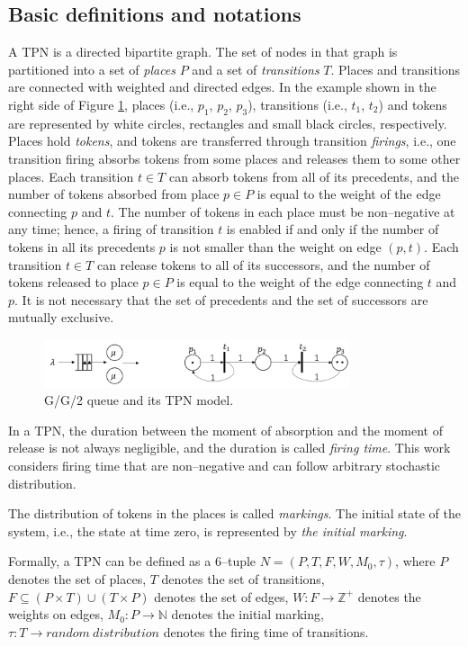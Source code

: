 \documentclass[suppldata]{interact}
\theoremstyle{plain}
\theoremstyle{definition}
\theoremstyle{remark}
\begin{document}
\subsection{Basic definitions and notations}
A TPN is a directed bipartite graph. The set of nodes in that graph is partitioned into a set of \textit{places} $P$ and a set of \textit{transitions} $T$. Places and transitions are connected with weighted and directed edges. In the example shown in the right side of Figure \ref{fig:gg1_petri}, places (i.e., $p_1$, $p_2$, $p_3$), transitions (i.e., $t_1$, $t_2$) and tokens are represented by white circles, rectangles and small black circles, respectively. Places hold \textit{tokens}, and tokens are transferred through transition \textit{firings}, i.e., one transition firing absorbs tokens from some places and releases them to some other places. Each transition $t\in{T}$ can absorb tokens from all of its precedents, and the number of tokens absorbed from place $p\in P$ is equal to the weight of the edge connecting $p$ and $t$. The number of tokens in each place must be non--negative at any time; hence, a firing of transition $t$ is enabled if and only if the number of tokens in all its precedents $p$ is not smaller than the weight on edge $(p,t)$. Each transition $t\in{T}$ can release tokens to all of its successors, and the number of tokens released to place $p\in P$ is equal to the weight of the edge connecting $t$ and $p$.  It is not necessary that the set of precedents and the set of successors are mutually exclusive. 
\begin{figure}[h]
	\centering
	\includegraphics[width=0.8\textwidth]{Figures/GG1_petri.png}
	\caption{G/G/2 queue and its TPN model.}
	\label{fig:gg1_petri}
\end{figure}
In a TPN, the duration between the moment of absorption and the moment of release is not always negligible, and the duration is called \textit{firing time}. This work considers firing time %
that are non--negative and can follow arbitrary stochastic distribution. 

The distribution of tokens in the places is called \textit{markings}. The initial state of the system, i.e., the state at time zero, is represented by \textit{the initial marking}. 

Formally, a TPN can be defined as a 6--tuple $N=(P, T, F,W, M_0, \tau)$, where ${P}$ denotes the set of places, ${T}$ denotes the set of transitions, ${F}\subseteq(P\times T)\cup(T\times P)$ denotes the set of edges, $W:F \rightarrow \mathbb{Z}^{+}$ denotes the weights on edges, $M_0:P\rightarrow \mathbb{N}$ denotes the initial marking,
	$\tau:T\rightarrow random\ distribution$ denotes the firing time of transitions.
\end{document}
